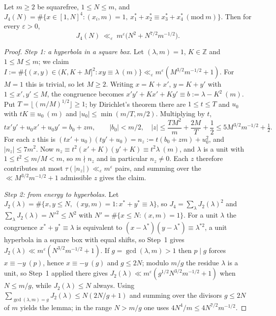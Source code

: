 \documentclass[11pt,a4paper]{article}
\newcommand{\Z}{\mathbb{Z}}\newcommand{\R}{\mathbb{R}}\newcommand{\Off}{\mathrm{Off}}\newcommand{\e}{\mathrm{e}}
\begin{document}
\begin{lemma}\label{lem:E}
Let $m\ge2$ be squarefree, $1\le N\le m$, and
$J_4(N)=\#\{x\in[1,N]^4:(x_i,m)=1,\ x_1^\ast+x_2^\ast\equiv x_3^\ast+x_4^\ast\ (\mathrm{mod}\ m)\}$. Then for every $\varepsilon>0$,
\[
J_4(N)\ \ll_\varepsilon\ m^{\varepsilon}\bigl(N^2+N^{7/2}m^{-1/2}\bigr).
\]
\end{lemma}
\begin{proof}
\emph{Step 1: a hyperbola in a square box.} Let $(\lambda,m)=1$, $K\in\Z$ and $1\le M\le m$; we claim
$I:=\#\{(x,y)\in(K,K+M]^2:xy\equiv\lambda\ (m)\}\ll_\varepsilon m^{\varepsilon}(M^{3/2}m^{-1/2}+1)$. For $M=1$ this is trivial, so let $M\ge2$. Writing $x=K+x'$, $y=K+y'$ with
$1\le x',y'\le M$, the congruence becomes $x'y'+Kx'+Ky'\equiv b:=\lambda-K^2\ (m)$. Put $T=\lfloor(m/M)^{1/2}\rfloor\ge1$; by Dirichlet's theorem there are $1\le t\le T$ and $u_0$
with $tK\equiv u_0\ (m)$ and $|u_0|\le\min(m/T,m/2)$. Multiplying by $t$,
\[
tx'y'+u_0x'+u_0y'=b_0+zm,\qquad |b_0|<m/2,\quad |z|\le\frac{TM^2}m+\frac{2M}T+\frac12\le 5M^{3/2}m^{-1/2}+\tfrac12 .
\]
For each $z$ this is $(tx'+u_0)(ty'+u_0)=n_z:=t(b_0+zm)+u_0^2$, and $|n_z|\le7m^2$. Now $n_z\equiv t^2(x'+K)(y'+K)\equiv t^2\lambda\ (m)$, and $\lambda$ is a unit with
$1\le t^2\le m/M<m$, so $m\nmid n_z$ and in particular $n_z\ne0$. Each $z$ therefore contributes at most $\tau(|n_z|)\ll_\varepsilon m^{\varepsilon}$ pairs, and summing over the
$\ll M^{3/2}m^{-1/2}+1$ admissible $z$ gives the claim.

\emph{Step 2: from energy to hyperbolas.} Let $J_2(\lambda)=\#\{x,y\le N,\ (xy,m)=1:x^\ast+y^\ast\equiv\lambda\}$, so $J_4=\sum_\lambda J_2(\lambda)^2$ and
$\sum_\lambda J_2(\lambda)=N'^2\le N^2$ with $N'=\#\{x\le N:(x,m)=1\}$. For a unit $\lambda$ the congruence $x^\ast+y^\ast\equiv\lambda$ is equivalent to
$(x-\lambda^\ast)(y-\lambda^\ast)\equiv\lambda^{\ast2}$, a unit hyperbola in a square box with equal shifts, so Step~1 gives $J_2(\lambda)\ll m^{\varepsilon}(N^{3/2}m^{-1/2}+1)$.
If $g=\gcd(\lambda,m)>1$ then $p\mid g$ forces $x\equiv-y\ (p)$, hence $x\equiv-y\ (g)$ and $g\le2N$; modulo $m/g$ the residue $\lambda$ is a unit, so Step~1 applied there gives
$J_2(\lambda)\ll m^{\varepsilon}(g^{1/2}N^{3/2}m^{-1/2}+1)$ when $N\le m/g$, while $J_2(\lambda)\le N$ always. Using $\sum_{\gcd(\lambda,m)=g}J_2(\lambda)\le N(2N/g+1)$ and summing
over the divisors $g\le2N$ of $m$ yields the lemma; in the range $N>m/g$ one uses $4N^4/m\le4N^{7/2}m^{-1/2}$.
\end{proof}
\end{document}
